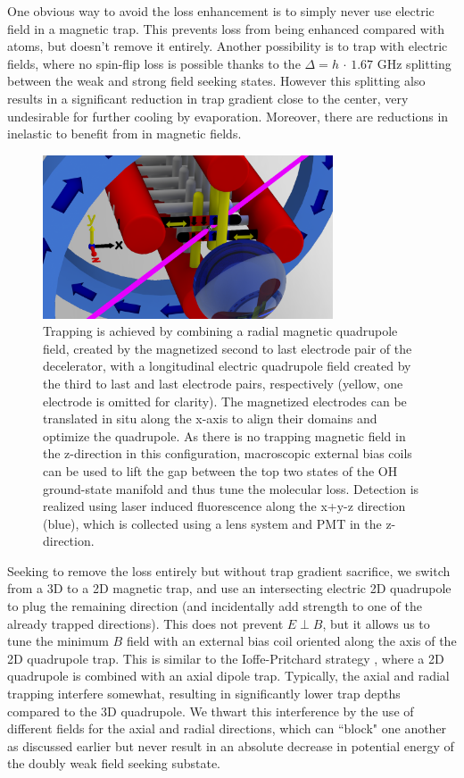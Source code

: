 \documentclass[%
 reprint,
 amsmath,amssymb,
 aps,
prl,
]{revtex4-1}
\begin{document}


One obvious way to avoid the loss enhancement is to simply never use electric field in a magnetic trap. This prevents loss from being enhanced compared with atoms, but doesn't remove it entirely. Another possibility is to trap with electric fields, where no spin-flip loss is possible thanks to the $\Delta=h\,\cdot\,1.67\text{ GHz}$ splitting between the weak and strong field seeking states. However this splitting also results in a significant reduction in trap gradient close to the center, very undesirable for further cooling by evaporation. Moreover, there are reductions in inelastic to benefit from in magnetic fields. \cite{stuhl2012evap}

\begin{figure}
\includegraphics[width=86mm]{CAD_recolor_laser.PNG}%
\caption{
Trapping is achieved by combining a radial magnetic quadrupole field, created by the magnetized second to last electrode pair of the decelerator, with a longitudinal electric quadrupole field created by the third to last and last electrode pairs, respectively (yellow, one electrode is omitted for clarity). The magnetized electrodes can be translated in situ along the x-axis to align their domains and optimize the quadrupole. As there is no trapping magnetic field in the z-direction in this configuration, macroscopic external bias coils can be used to lift the gap between the top two states of the OH ground-state manifold and thus tune the molecular loss. Detection is realized using laser induced fluorescence along the x+y-z direction (blue), which is collected using a lens system and PMT in the z-direction.
\label{fig:CAD}}
\end{figure}

Seeking to remove the loss entirely but without trap gradient sacrifice, we switch from a 3D to a 2D magnetic trap, and use an intersecting electric 2D quadrupole to plug the remaining direction (and incidentally add strength to one of the already trapped directions). This does not prevent $E\!\perp\! B$, but it allows us to tune the minimum $B$ field with an external bias coil oriented along the axis of the 2D quadrupole trap. This is similar to the Ioffe-Pritchard strategy \cite{pritchard1983}, where a 2D quadrupole is combined with an axial dipole trap. Typically, the axial and radial trapping interfere somewhat, resulting in significantly lower trap depths compared to the 3D quadrupole. We thwart this interference by the use of different fields for the axial and radial directions, which can ``block" one another as discussed earlier but never result in an absolute decrease in potential energy of the doubly weak field seeking substate. 
\end{document}
